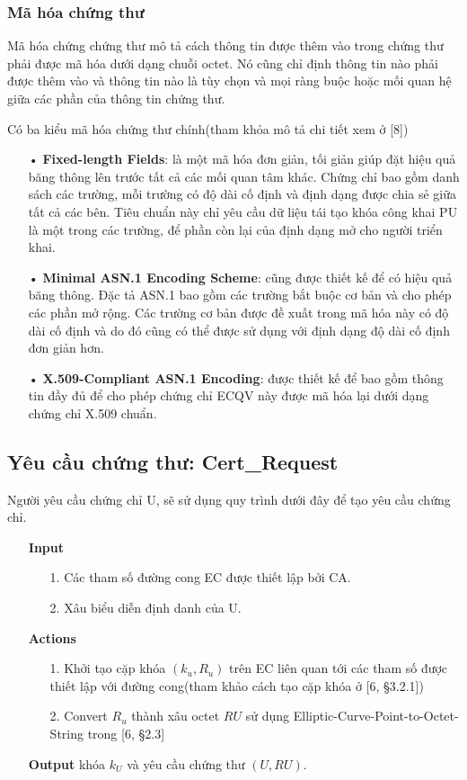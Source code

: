 \documentclass[a4paper,12pt]{report}
\begin{document}
\subsubsection{Mã hóa chứng thư} \label{subsec:3.5.2.1}
Mã hóa chứng chứng thư mô tả cách thông tin được thêm vào trong chứng thư phải được mã hóa dưới dạng chuỗi octet. Nó cũng chỉ định thông tin nào phải được thêm vào và thông tin nào là tùy chọn và mọi ràng buộc hoặc mối quan hệ giữa các phần của thông tin chứng thư.

Có ba kiểu mã hóa chứng thư chính(tham khỏa mô tả chi tiết xem ở [8])
\begin{itemize}
\item[•] \textbf{Fixed-length Fields}: là một mã hóa đơn giản, tối giản giúp đặt hiệu quả băng thông lên trước tất cả các mối quan tâm khác. Chứng chỉ bao gồm danh sách các trường, mỗi trường có độ dài cố định và định dạng được chia sẻ giữa tất cả các bên. Tiêu chuẩn này chỉ yêu cầu dữ liệu tái tạo khóa công khai PU là một trong các trường, để phần còn lại của định dạng mở cho người triển khai.
\item[•] \textbf{Minimal ASN.1 Encoding Scheme}: cũng được thiết kế để có hiệu quả băng thông. Đặc tả ASN.1 bao gồm các trường bắt buộc cơ bản và cho phép các phần mở rộng. Các trường cơ bản được đề xuất trong mã hóa này có độ dài cố định và do đó cũng có thể được sử dụng với định dạng độ dài cố định đơn giản hơn.
\item[•] \textbf{X.509-Compliant ASN.1 Encoding}: được thiết kế để bao gồm thông tin đầy đủ để cho phép chứng chỉ ECQV này được mã hóa lại dưới dạng chứng chỉ X.509 chuẩn.
\end{itemize}
\subsection{Yêu cầu chứng thư: Cert\_Request}
Người yêu cầu chứng chỉ U, sẽ sử dụng quy trình dưới đây để tạo yêu cầu chứng chỉ.
\begin{itemize}
\item[] \textbf{Input}
\begin{itemize}
\item[1. ] Các tham số đường cong EC được thiết lập bởi CA.
\item[2. ] Xâu biểu diễn định danh của U.
\end{itemize}
\item[] \textbf{Actions}
\begin{itemize}
\item[1. ] Khởi tạo cặp khóa $(k_u, R_u)$  trên EC liên quan tới các tham số được thiết lập với đường cong(tham khảo cách tạo cặp khóa ở [6, §3.2.1])
\item[2. ] Convert $R_u$ thành xâu octet $RU$ sử dụng  Elliptic-Curve-Point-to-Octet-String trong [6, §2.3]
\end{itemize}
\item[] \textbf{Output} khóa $k_U$ và yêu cầu chứng thư $(U, RU)$.
\end{itemize}
\end{document}
